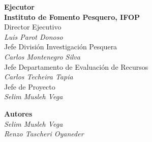 \begin{flushright}
{  {\color{ifopceleste}\bfseries Ejecutor}\\[0.2cm]
  {\bfseries Instituto de Fomento Pesquero, IFOP}\\[0.4cm]
  Director Ejecutivo\\
  {\itshape Luis Parot Donoso}\\[0.4cm]
  Jefe División Investigación Pesquera\\
  {\itshape Carlos Montenegro Silva}\\[0.4cm]
  Jefe Departamento de Evaluación de Recursos\\
  {\itshape Carlos Techeira Tapia}\\[0.4cm]
  Jefe de Proyecto\\
  {\itshape Selim Musleh Vega}

  \vspace{0.4cm}

  {\color{ifopceleste}\bfseries Autores}\\[0.2cm]
  {\itshape Selim Musleh Vega}\\
  {\itshape Renzo Tascheri Oyaneder}

}
\end{flushright}

\restoregeometry
\clearpage
